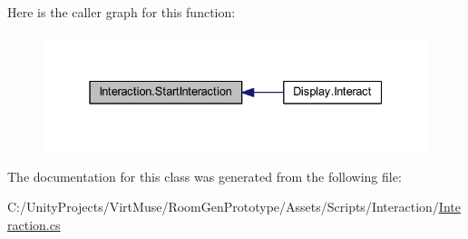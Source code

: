 Here is the caller graph for this function\+:\nopagebreak
\begin{figure}[H]
\begin{center}
\leavevmode
\includegraphics[width=331pt]{class_interaction_afa5031e1db8f7c23cf26c896937e69f9_icgraph}
\end{center}
\end{figure}


The documentation for this class was generated from the following file\+:\begin{DoxyCompactItemize}
\item 
C\+:/\+Unity\+Projects/\+Virt\+Muse/\+Room\+Gen\+Prototype/\+Assets/\+Scripts/\+Interaction/\mbox{\hyperlink{_interaction_8cs}{Interaction.\+cs}}\end{DoxyCompactItemize}
